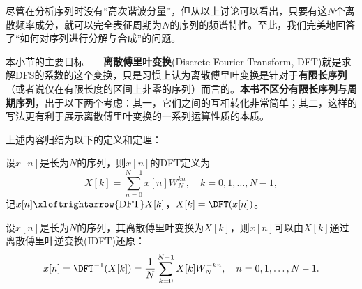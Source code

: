 尽管在分析序列时没有“高次谐波分量”，但从以上讨论可以看出，只要有这$N$个离散频率成分，就可以完全表征周期为$N$的序列的频谱特性。至此，我们完美地回答了“如何对序列进行分解与合成”的问题。

本小节的主要目标——\textbf{离散傅里叶变换}(Discrete Fourier Transform, DFT)就是求解DFS的系数的这个变换，只是习惯上认为离散傅里叶变换是针对于\textbf{有限长序列}（或者说仅在有限长度的区间上非零的序列）而言的\cite{dsp}。\textbf{本书不区分有限长序列与周期序列}，出于以下两个考虑：其一，它们之间的互相转化非常简单；其二，这样的写法更有利于展示离散傅里叶变换的一系列运算性质的本质。

上述内容归结为以下的定义和定理：

\begin{definition}[离散傅里叶变换]\label{def:DFT}
    设$x[n]$是长为$N$的序列，则$x[n]$的DFT定义为
    \begin{equation}
        X[k]=\sum_{n=0}^{N-1}x[n]W_N^{kn},\quad k=0,1,\dots,N-1,
    \end{equation}
    记$x[n]\xleftrightarrow{\mathrm{DFT}}X[k]$，$X[k]=\DFT(x[n])$。
\end{definition}

\begin{theorem}[离散傅里叶反演公式]\label{thm:DFT_inv}
    设$x[n]$是长为$N$的序列，其离散傅里叶变换为$X[k]$，则$x[n]$可以由$X[k]$通过离散傅里叶逆变换(IDFT)还原：
    \begin{equation}
        x[n]=\DFT^{-1}(X[k])=\frac{1}{N}\sum_{k=0}^{N-1}X[k]W_N^{-kn},\quad n=0,1,\dots,N-1.
    \end{equation}
\end{theorem}

